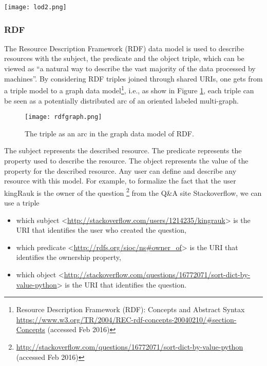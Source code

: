 \begin{sidewaysfigure}%
\centering
\texttt{[image: lod2.png]}  
\caption{Linked Open Data cloud diagram.}
\label{fig:lod} 
\end{sidewaysfigure}

\subsubsection{RDF}
The Resource Description Framework (RDF) data model is used to describe resources with the subject, the predicate and the object triple, which can be viewed as ``a natural way to describe the vast majority of the data processed by machines''. 
By considering  RDF triples joined through shared URIs, one gets from a triple model to a graph data model\footnote{Resource Description Framework (RDF): Concepts and Abstract Syntax \url{https://www.w3.org/TR/2004/REC-rdf-concepts-20040210/#section-Concepts} (accessed Feb 2016)}, i.e., as show in Figure \ref{fig:rdfgraph}, each triple can be seen as a potentially distributed arc of an oriented labeled multi-graph. 

\begin{figure}%
\centering
\texttt{[image: rdfgraph.png]}  
\caption{The triple as an arc in the graph data model of RDF.}
\label{fig:rdfgraph} 
\end{figure}

The subject represents the described resource. The predicate represents the property used to describe the resource. The object represents the value of the property for the described resource. Any user can define and describe any resource with this model. 
For example, to formalize the fact that the user kingRauk is the owner of the question \footnote{\url{http://stackoverflow.com/questions/16772071/sort-dict-by-value-python} (accessed Feb 2016)} from the Q\&A site Stackoverflow, we can use a triple 
\begin{itemize}
\item which subject <\url{http://stackoverflow.com/users/1214235/kingrauk}> is the URI that identifies the user who created the question,
\item which predicate <\url{http://rdfs.org/sioc/ns#owner_of}> is the URI that identifies the ownership property,
\item which object <\url{http://stackoverflow.com/questions/16772071/sort-dict-by-value-python}> is the URI that identifies the question.
\end{itemize}

